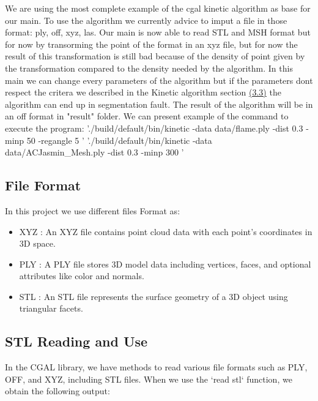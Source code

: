 \documentclass{article}
\begin{document}
We are using the most complete example of the cgal kinetic algorithm as base for our main.
\newline
To use the algorithm we currently advice to imput a file in those format: ply, off, xyz, las.
Our main is now able to read STL and MSH format but for now by transorming the point of the format in an xyz file,
but for now the result of this transformation is still bad because of the density of point given by the transformation compared to the density needed by the algorithm.
In this main we can change every parameters of the algorithm but if the parameters dont respect the critera we described in the Kinetic algorithm section \hyperref[subsec:Kinetic algorithm]{ (3.3)} the algorithm can end up in segmentation fault.
The result of the algorithm will be in an off format in "result" folder.
\newline
We can present example of the command to execute the program:
\newline
'./build/default/bin/kinetic -data data/flame.ply -dist 0.3 -minp 50 -regangle 5 '\newline
'./build/default/bin/kinetic -data data/ACJasmin\_Mesh.ply -dist 0.3 -minp 300 '
 


\subsection{File Format}
In this project we use different files Format as: 

\begin{itemize}
  \item XYZ : An XYZ file contains point cloud data with each point's coordinates in 3D space.
  \item PLY : A PLY file stores 3D model data including vertices, faces, and optional attributes like color and normals.
  \item STL : An STL file represents the surface geometry of a 3D object using triangular facets.
  
\end{itemize}

\subsection{STL Reading and Use}

In the CGAL library, we have methods to read various file formats such as PLY, OFF, and XYZ, including STL files. When we use the `read stl` function, we obtain the following output:
\end{document}
